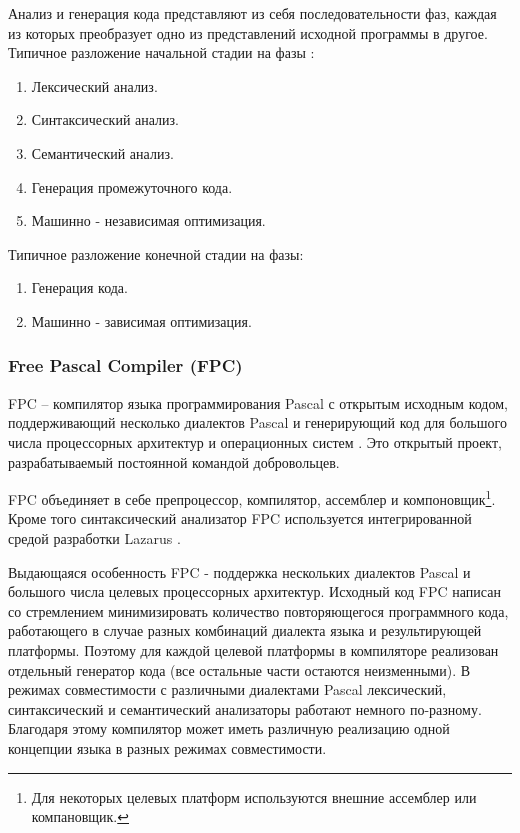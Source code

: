 \documentclass{imcs}
\begin{document}
Анализ и генерация кода представляют из себя последовательности фаз, каждая из которых
преобразует одно из представлений исходной программы в другое. Типичное разложение
начальной стадии на фазы \cite{dragonbook}:
\begin{enumerate}
    \item Лексический анализ.
    \item Синтаксический анализ.
    \item Семантический анализ.
    \item Генерация промежуточного кода.
    \item Машинно - независимая оптимизация.
\end{enumerate}
Типичное разложение конечной стадии на фазы:
\begin{enumerate}      
    \item Генерация кода.
    \item Машинно - зависимая оптимизация.
\end{enumerate}

\subsubsection{Free Pascal Compiler (FPC)}
FPC -- компилятор языка программирования Pascal с открытым исходным
кодом, поддерживающий несколько диалектов Pascal и генерирующий код для большого
числа процессорных архитектур и операционных систем \cite{fpc}. Это открытый проект,
разрабатываемый постоянной командой добровольцев.

FPC объединяет в себе препроцессор, компилятор, ассемблер и 
компоновщик\footnote{Для некоторых целевых платформ используются внешние ассемблер или компановщик.}.
Кроме того синтаксический анализатор FPC используется интегрированной средой разработки
Lazarus \cite{lazarus}.

Выдающаяся особенность FPC - поддержка нескольких диалектов Pascal 
и большого числа целевых процессорных архитектур. Исходный код FPC написан со
стремлением минимизировать количество повторяющегося программного кода,
работающего в случае разных комбинаций
диалекта языка и результирующей платформы. Поэтому для каждой целевой платформы
в компиляторе реализован отдельный генератор кода (все остальные части остаются
неизменными). В режимах совместимости с различными диалектами Pascal лексический,
синтаксический и семантический анализаторы работают немного по-разному. Благодаря этому
компилятор может иметь различную реализацию одной концепции языка в разных режимах
совместимости.
\end{document}
